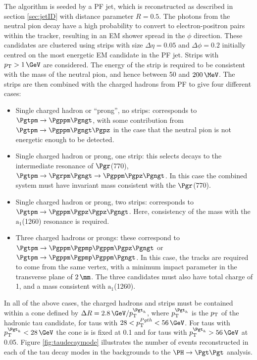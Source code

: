 The algorithm is seeded by a \ac{PF} jet, which is reconstructed as described in
section \ref{sec:jetID} with distance parameter $R=0.5$. The photons from the neutral pion decay have a high
probability to convert to electron-positron pairs within the tracker, resulting
in an EM shower spread in the $\phi$ direction. These candidates are clustered
using strips with size $\Delta\eta = 0.05$ and $\Delta\phi = 0.2$ initially
centred on the most energetic EM candidate in the \ac{PF} jet. Strips with
$\pt>1\,\GeV$ are considered. The energy of the
strip is required to be consistent with the mass of the neutral pion, and hence
between 50 and $200\,\MeV$. The strips are then combined with the charged hadrons
from \ac{PF} to give four different cases:

\begin{itemize}
\item Single charged hadron or ``prong'', no strips: corresponds to $\Pgtpm\to\Pgppm\Pgngt$,
with some contribution from $\Pgtpm\to\Pgppm\Pgngt\Pgpz$ in the case that the
neutral pion is not energetic enough to be detected.
\item Single charged hadron or prong, one strip: this selects decays to the intermediate
resonance of $\Pgr$(770), $\Pgtpm\to\Pgrpm\Pgngt\to\Pgppm\Pgpz\Pgngt$. In this
case the combined system must have invariant mass consistent with the
$\Pgr$(770).
\item Single charged hadron or prong, two strips: corresponds to
$\Pgtpm\to\Pgppm\Pgpz\Pgpz\Pgngt$. Here, consistency of the mass with the
$\text{a}_{1}$(1260) resonance is required. 
\item Three charged hadrons or prongs: these correspond to
$\Pgtpm\to\Pgppm\Pgpmp\Pgppm\Pgpz\Pgngt$ or $\Pgtpm\to\Pgppm\Pgpmp\Pgppm\Pgngt$. 
In this case, the tracks are required
to come from the same vertex, with a minimum impact parameter in the transverse
plane of $2\,\mm$. The three candidates must also have total charge of 1, and a
mass consistent with $\text{a}_{1}$(1260). 
\end{itemize}

In all of the above cases, the charged hadrons and strips must be contained
within a cone defined by $\Delta R=2.8\,\GeV/\pt^{\Pgth}$, where
$\pt^{\Pgth}$ is the $p_{\mathrm{T}}$ of the hadronic tau candidate, for taus with $28 <
\pt^{Pgth} < 56\,\GeV$. For taus with $\pt^{\Pgth} < 28\,\GeV$ the cone is
is fixed at 0.1 and for taus with $\pt^{\Pgth} > 56\,\GeV$ at 0.05. 
Figure \ref{fig:taudecaymode} illustrates the number of events reconstructed in
each of the tau decay modes in the backgrounds to the $\PH \to \Pgt\Pgt$ analysis.

